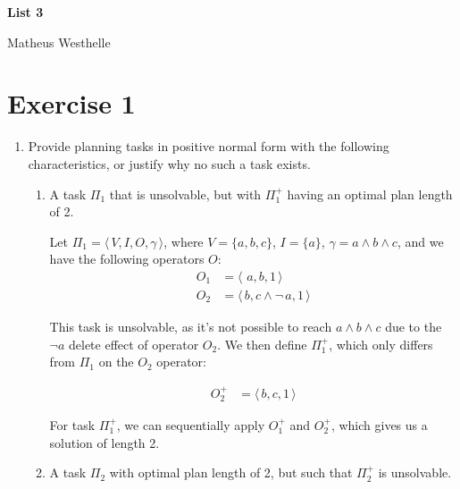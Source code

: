 \documentclass[11pt]{article}
\begin{document}
\begin{titlepage}

    \thispagestyle{firstpage}
    \vspace*{1in}
    \begin{center}
      {\LARGE\bfseries List 3 \par}
      \vspace{0.2in}
      {\large Matheus Westhelle \par}
    \end{center}

\section*{Exercise 1}

\begin{enumerate}[label=(\alph*)]
\item Provide planning tasks in positive normal form with the following characteristics, or justify
why no such a task exists.
\begin{enumerate}[label=(\roman*)]
\item A task $\Pi_1$ that is unsolvable, but with $\Pi^{+}_1$ having an optimal plan length of 2. \par
\vspace{5mm}
Let $\Pi_1 = \langle \, V, I, O, \gamma \, \rangle$, where $V = \{ a, b, c \}$,
$I = \{ a \}$,
$\gamma = a \land b \land c$, and we have
the following operators $O$:
\begin{align*}
    O_1 &= \langle \, \,a, b, 1 \, \rangle \\
    O_2 &= \langle \, b, c \land \neg\,a, 1 \, \rangle
\end{align*}

This task is unsolvable, as it's not possible to reach $a \land b \land c$ due to the $\neg a$ delete
effect of operator $O_2$. We then define $\Pi_1^{+}$, which only differs from $\Pi_1$ on
the $O_2$ operator:

\begin{align*}
    O_2^{+} &= \langle \, b, c, 1 \, \rangle
\end{align*}

\noindent For task $\Pi_1^{+}$, we can sequentially apply $O_1^{+}$ and $O_2^{+}$, which gives us a solution of length 2.

\item A task $\Pi_2$ with optimal plan length of 2, but such that $\Pi_2^{+}$ is unsolvable.
\vspace{5mm}


\end{enumerate}
\end{enumerate}
\end{titlepage}
\end{document}
